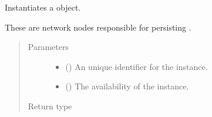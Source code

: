 \documentclass[letterpaper,10pt,english]{sphinxmanual}
\begin{document}
\begin{fulllineitems}
\begin{fulllineitems}
\end{fulllineitems}


\begin{fulllineitems}
\label{\detokenize{app.domain:app.domain.network_nodes.NewscastNode.__init__}}
Instantiates a  object.

These are network nodes responsible for persisting
.
\begin{quote}\begin{description}
\item[{Parameters}] \leavevmode\begin{itemize}
\item {} 
 () \textendash{} An unique identifier for the  instance.

\item {} 
 () \textendash{} The availability of the  instance.

\end{itemize}

\item[{Return type}] \leavevmode
{}

\end{description}\end{quote}

\end{fulllineitems}



\end{fulllineitems}
\end{document}

